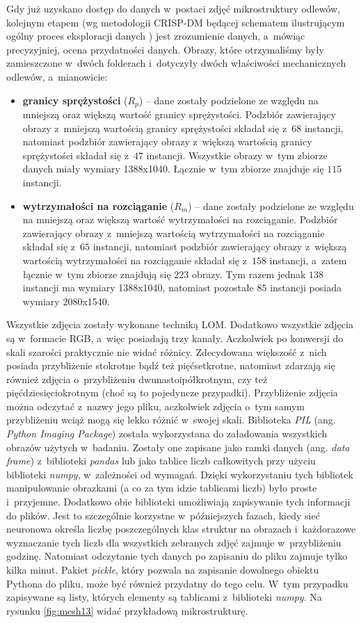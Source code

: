 Gdy już uzyskano dostęp do danych w~postaci zdjęć mikrostruktury odlewów, kolejnym etapem (wg metodologii CRISP-DM będącej schematem ilustrującym ogólny proces eksploracji danych \cite{Watson00}) jest zrozumienie danych, a~mówiąc precyzyjniej, ocena przydatności danych. 
Obrazy, które otrzymaliśmy były zamieszczone w~dwóch folderach i~dotyczyły dwóch właściwości mechanicznych odlewów, a~mianowicie:
\begin{itemize}
	\item \textbf{granicy sprężystości} ($R_p$) – dane zostały podzielone ze względu na mniejszą oraz większą wartość granicy sprężystości. Podzbiór zawierający obrazy z~mniejszą wartością granicy sprężystości składał się z~$68$ instancji, natomiast podzbiór zawierający obrazy z~większą wartością granicy sprężystości składał się z~$47$ instancji. Wszystkie obrazy w~tym zbiorze danych miały wymiary 1388x1040. Łącznie w~tym zbiorze znajduje się $115$ instancji.
	\item \textbf{wytrzymałości na rozciąganie} ($R_{m}$) – dane zostały podzielone ze względu na mniejszą oraz większą wartość wytrzymałości na rozciąganie. Podzbiór zawierający obrazy z~mniejszą wartością wytrzymałości na rozciąganie składał się z~$65$ instancji, natomiast podzbiór zawierający obrazy z~większą wartością wytrzymałości na rozciąganie składał się z~$158$ instancji, a~zatem łącznie w~tym zbiorze znajdują się $223$ obrazy. Tym razem jednak $138$ instancji ma wymiary 1388x1040, natomiast pozostałe $85$ instancji posiada wymiary 2080x1540.
\end{itemize}
Wszystkie zdjęcia zostały wykonane techniką LOM. Dodatkowo wszystkie zdjęcia są w~formacie RGB, a~więc posiadają trzy kanały. Aczkolwiek po konwersji do skali szarości praktycznie nie widać różnicy. Zdecydowana większość z~nich posiada przybliżenie stokrotne bądź też pięćsetkrotne, natomiast zdarzają się również zdjęcia o~przybliżeniu dwunastoipółkrotnym, czy też pięćdziesięciokrotnym (choć są to pojedyncze przypadki). Przybliżenie zdjęcia można odczytać z~nazwy jego pliku, aczkolwiek zdjęcia o~tym samym przybliżeniu wciąż mogą się lekko różnić w~swojej skali. Biblioteka \textit{PIL} (ang. \textit{Python Imaging Package}) została wykorzystana do załadowania wszystkich obrazów użytych w~badaniu. Zostały one zapisane jako ramki danych (ang. \textit{data frame}) z~biblioteki \textit{pandas} lub jako tablice liczb całkowitych przy użyciu biblioteki \textit{numpy}, w~zależności od wymagań. Dzięki wykorzystaniu tych bibliotek manipulowanie obrazkami (a co za tym idzie tablicami liczb) było proste i~przyjemne. Dodatkowo obie biblioteki umożliwiają zapisywanie tych informacji do plików. Jest to szczególnie korzystne w~późniejszych fazach, kiedy sieć neuronowa określa liczbę poszczególnych klas struktur na obrazach i~każdorazowe wyznaczanie tych liczb dla wszystkich zebranych zdjęć zajmuje w~przybliżeniu godzinę. Natomiast odczytanie tych danych po zapisaniu do pliku zajmuje tylko kilka minut. Pakiet \textit{pickle}, który pozwala na zapisanie dowolnego obiektu Pythona do pliku, może być również przydatny do tego celu. W~tym przypadku zapisywane są listy, których elementy są tablicami z~biblioteki \textit{numpy}. Na rysunku \ref{fig:mesh13} widać przykładową mikrostrukturę.
